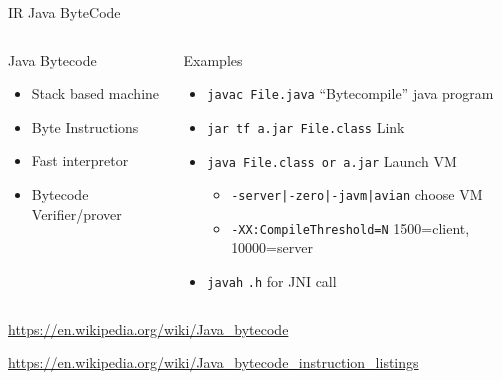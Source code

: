 %
\begin{Frame}{IR Java ByteCode}
  \begin{columns}[t]
    \begin{column}{5cm} %
      \begin{block}{Java Bytecode}
        \begin{itemize}
        \item Stack based machine
        \item Byte Instructions
        \item Fast interpretor
        \item Bytecode Verifier/prover
        \end{itemize}
      \end{block} 
    \end{column}
    
    \begin{column}{6cm} %
      \begin{block}{Examples}
        \begin{itemize}
        \item \texttt{javac File.java} ``Bytecompile'' java program
        \item \texttt{jar tf a.jar File.class} Link
        \item \texttt{java File.class or a.jar} Launch VM
          \begin{itemize}
          \item \texttt{-server|-zero|-javm|avian} choose VM
          \item \texttt{-XX:CompileThreshold=N} 1500=client,
            10000=server
          \end{itemize}
        \item \texttt{javah} \texttt{.h} for JNI call
        \end{itemize}
      \end{block}   
    \end{column}
  \end{columns}  
\url{https://en.wikipedia.org/wiki/Java_bytecode}

\url{https://en.wikipedia.org/wiki/Java_bytecode_instruction_listings}
\end{Frame}


